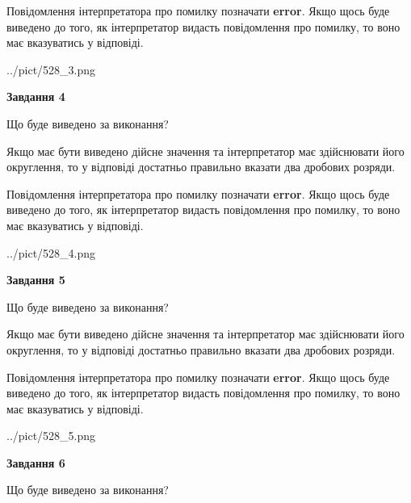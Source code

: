 \documentclass[12pt, ukrainian]{article}
\begin{document}
{\begin {Large}
Повідомлення інтерпретатора про помилку позначати \textbf{error}.
Якщо щось буде виведено до того, як інтерпретатор видасть повідомлення про помилку, 
то воно має вказуватись у відповіді. \par

\begin{center}
	{../pict/528_3.png}
\end{center}
\newpage

{\begin {center}\textbf{Завдання 4}\end {center}}\par
Що буде виведено за виконання? \par

Якщо має бути виведено дійсне значення та інтерпретатор має здійснювати його округлення, 
то у відповіді достатньо правильно вказати два дробових розряди.

Повідомлення інтерпретатора про помилку позначати \textbf{error}.
Якщо щось буде виведено до того, як інтерпретатор видасть повідомлення про помилку, 
то воно має вказуватись у відповіді. \par

\begin{center}
	{../pict/528_4.png}
\end{center}
\newpage

{\begin {center}\textbf{Завдання 5}\end {center}}\par
Що буде виведено за виконання? \par

Якщо має бути виведено дійсне значення та інтерпретатор має здійснювати його округлення, 
то у відповіді достатньо правильно вказати два дробових розряди.

Повідомлення інтерпретатора про помилку позначати \textbf{error}.
Якщо щось буде виведено до того, як інтерпретатор видасть повідомлення про помилку, 
то воно має вказуватись у відповіді. \par

\begin{center}
	{../pict/528_5.png}
\end{center}
\newpage

{\begin {center}\textbf{Завдання 6}\end {center}}\par
Що буде виведено за виконання? \par


\end{Large}}
\end{document}
